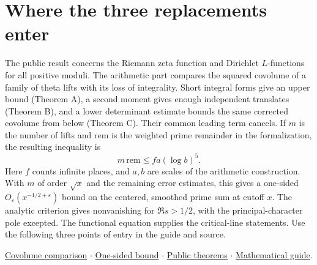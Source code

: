 \documentclass[11pt,letterpaper]{article}
\begin{document}
\section{Where the three replacements enter}
The public result concerns the Riemann zeta function and Dirichlet $L$-functions for all positive moduli. The arithmetic part compares the squared covolume of a family of theta lifts with its loss of integrality. Short integral forms give an upper bound (Theorem A), a second moment gives enough independent translates (Theorem B), and a lower determinant estimate bounds the same corrected covolume from below (Theorem C). Their common leading term cancels. If $m$ is the number of lifts and $\mathrm{rem}$ is the weighted prime remainder in the formalization, the resulting inequality is
\[
 m\,\mathrm{rem}\le f a(\log b)^5 .
\]
Here $f$ counts infinite places, and $a,b$ are scales of the arithmetic construction. With $m$ of order $\sqrt{x}$ and the remaining error estimates, this gives a one-sided $O_\varepsilon(x^{-1/2+\varepsilon})$ bound on the centered, smoothed prime sum at cutoff $x$. The analytic criterion gives nonvanishing for $\Re s>1/2$, with the principal-character pole excepted. The functional equation supplies the critical-line statements. Use the following three points of entry in the guide and source.
\par \href{https://github.com/VladimirReshetnikov/ProveIt/blob/8f274fb25a0be551cbb53ee802033689da108138/Analysis/GeneralizedRiemannHypothesis/Lean/grh/src/New/Reduction/MainInequality.lean}{Covolume comparison} $\cdot$ \href{https://github.com/VladimirReshetnikov/ProveIt/blob/8f274fb25a0be551cbb53ee802033689da108138/Analysis/GeneralizedRiemannHypothesis/Lean/grh/src/New/Reduction/OneSidedBound.lean}{One-sided bound} $\cdot$ \href{https://github.com/VladimirReshetnikov/ProveIt/blob/8f274fb25a0be551cbb53ee802033689da108138/Analysis/GeneralizedRiemannHypothesis/Lean/grh/src/Main.lean}{Public theorems} $\cdot$ \href{https://github.com/VladimirReshetnikov/ProveIt/blob/8f274fb25a0be551cbb53ee802033689da108138/Analysis/GeneralizedRiemannHypothesis/docs/guide/theta_lifts_and_dirichlet_zeros.tex}{Mathematical guide}.
\end{document}
